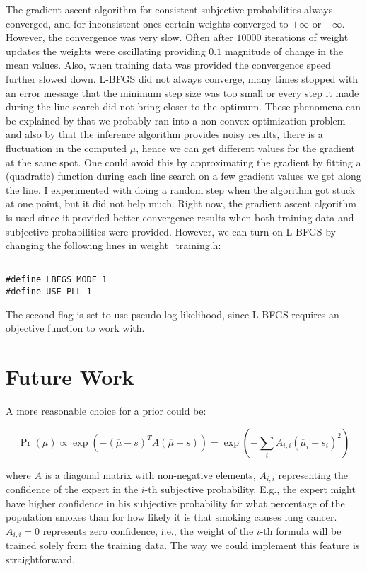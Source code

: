 \documentclass[12pt]{article}
\begin{document}
The gradient ascent algorithm for consistent subjective probabilities
always converged, and for inconsistent ones certain weights converged to 
$+\infty$ or $-\infty$. However, the convergence was very slow. Often after 
$10000$ iterations of weight updates the weights were oscillating providing
$0.1$ magnitude of change in the mean values. Also, when
training data was provided the convergence speed further slowed down.  
L-BFGS did not always converge, many times stopped with an error message
that the minimum step size was too small or every step it made during the
line search did not bring closer to the optimum.  These phenomena 
can be explained by that we probably ran into a non-convex optimization problem
and also by that the inference algorithm provides noisy results,
 there is a fluctuation in the computed $\mu$, hence we can get different 
values for the gradient at the same spot.
One could avoid this by approximating the gradient by fitting a (quadratic)
function during each line search on a few gradient values we get along the line.
I experimented with doing a random step when the algorithm got stuck at one 
point, but it did not help much.
Right now, the gradient ascent algorithm is used since it provided better 
convergence results when both training data and subjective probabilities were
provided. However, we can turn on L-BFGS by changing the following lines
in weight\_training.h:

\begin{verbatim}

#define LBFGS_MODE 1
#define USE_PLL 1

\end{verbatim}

The second flag is set to use pseudo-log-likelihood, since L-BFGS requires
an objective function to work with.

\section{Future Work}

A more reasonable choice for a prior could be:

\begin{equation}\label{eq-fut-prior-def}
  \Pr(\mu) \propto 
      \exp \left(
       -(\overline{\mu} - s)^{T} A (\overline{\mu} - s)
       \right)=
     \exp \left(- \sum_{i} A_{i,i}(\overline{\mu}_{i}- s_{i})^{2} \right)
\end{equation}

where $A$ is a diagonal matrix with non-negative elements, 
$A_{i,i}$ representing the confidence of the expert in the $i$-th subjective 
probability. E.g., the expert might have higher confidence in his subjective
probability for what percentage of the population smokes than for how likely
it is that smoking causes lung cancer. $A_{i,i}=0$ represents zero confidence,
i.e., the weight of the $i$-th formula will be trained solely from the training
data. The way we could implement this feature is straightforward.
\end{document}
